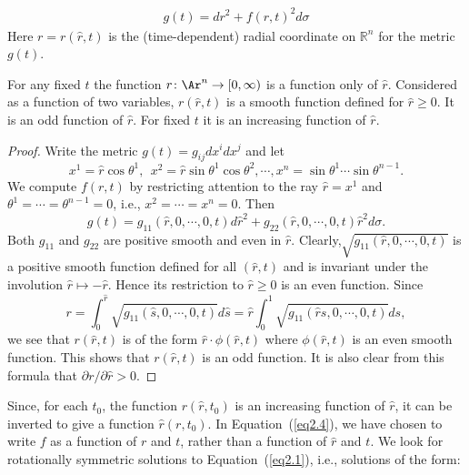 \begin{align}
g(t)=dr^2+f(r,t)^2 d \sigma \label{eq2.4}
\end{align}
Here $r=r(\hat r,t)$ is the (time-dependent) radial coordinate on
$\mathbb{R}^n$ for the metric $g(t)$.

\begin{claim}
\label{claim:radial-coordinate-properties}
\label{cl12.20}
For any fixed $t$ the function $r\colon \Ar^n \to[0,\infty)$ is a
function only of $\hat r$. Considered as a function of two
variables,
 $r(\hat r,t)$ is a smooth function defined for $\hat r\ge 0$. It is
 an odd function of $\hat r$. For fixed $t$ it is an increasing
 function of $\hat r$.
\end{claim}



\begin{proof}
Write the metric $g(t)=g_{ij}dx^idx^j$ and let
\begin{equation}
x^1  =  \hat{r} \cos \theta^1, \ \ x^2 =  \hat{r} \sin \theta^1 \cos
\theta^2, \cdots,
 x^n  =  \sin \theta^1 \cdots \sin \theta^{n-1}.
 \end{equation}
 We compute $f(r,t)$
by restricting attention to the ray $\hat{r}=x^1$ and $\theta^1
=\cdots=\theta^{n-1}=0$, i.e., $x^2 =\cdots =x^n=0$. Then
\[
g(t)=g_{11}(\hat{r},0,\cdots,0,t)d\hat{r}^2+g_{22}(\hat{r},0,\cdots,0,t)
\hat{r}^2 d \sigma.
\]
Both $g_{11}$ and $g_{22}$ are positive smooth and even in $\hat r$.
Clearly,$\sqrt{g_{11}(\hat r,0,\cdots,0,t)}$ is a positive smooth
function defined for all $(\hat r,t)$ and is invariant under the
involution $\hat r\mapsto -\hat r$. Hence its restriction to $\hat
r\ge0$ is an even function. Since
\[
r= \int_0^{\hat{r}} \sqrt{g_{11}(\hat{s},0,\cdots,0,t)}d\hat{s} =
\hat{r} \int_0^{1} \sqrt{g_{11}(\hat{r}s,0,\cdots,0,t)}ds,
\]
we see that $r(\hat r,t)$ is of the form $\hat r\cdot \phi(\hat
r,t)$ where $\phi(\hat r,t)$ is an even smooth function. This shows
that $r(\hat r,t)$ is an odd function. It is also clear from this
formula that $\partial r/\partial \hat r>0$.
\end{proof}




 Since, for each $t_0$, the function $r(\hat
r,t_0)$ is an increasing function of $\hat r$,  it can be inverted
to give a function $\hat r(r,t_0)$. In Equation~(\ref{eq2.4}), we
have chosen to write $f$ as a function of $r$ and $t$, rather than a
function of $\hat r$ and $t$. We look for rotationally symmetric
solutions to Equation~(\ref{eq2.1}), i.e., solutions of the form:

